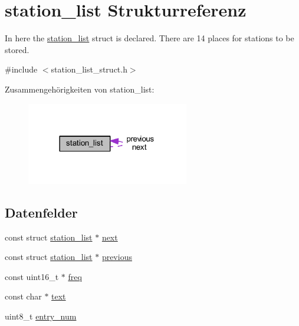 \hypertarget{structstation__list}{}\section{station\+\_\+list Strukturreferenz}
\label{structstation__list}


In here the \hyperlink{structstation__list}{station\+\_\+list} struct is declared. There are 14 places for stations to be stored.  




{\ttfamily \#include $<$station\+\_\+list\+\_\+struct.\+h$>$}



Zusammengehörigkeiten von station\+\_\+list\+:\nopagebreak
\begin{figure}[H]
\begin{center}
\leavevmode
\includegraphics[width=201pt]{structstation__list__coll__graph}
\end{center}
\end{figure}
\subsection*{Datenfelder}
\begin{DoxyCompactItemize}
\item 
const struct \hyperlink{structstation__list}{station\+\_\+list} $\ast$ \hyperlink{structstation__list_aaf7e88858b6e1e91f04c50ce118be602}{next}
\item 
const struct \hyperlink{structstation__list}{station\+\_\+list} $\ast$ \hyperlink{structstation__list_ae039c5ce88254ad89cea9170a5f3b740}{previous}
\item 
const uint16\+\_\+t $\ast$ \hyperlink{structstation__list_a0c8c7380b4e3197fe0b821b4a6dfbec9}{freq}
\item 
const char $\ast$ \hyperlink{structstation__list_a16343090e80c4472521560f30113d96c}{text}
\item 
uint8\+\_\+t \hyperlink{structstation__list_aab8c201217e885e0ee4e61820a289c0c}{entry\+\_\+num}
\end{DoxyCompactItemize}


